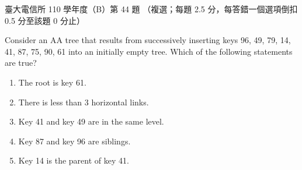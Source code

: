 \begin{pastexam}[label={px:ntu-110-comm-dsa-44}]{臺大電信所 110 學年度（B）第 44 題}
（複選；每題 2.5 分，每答錯一個選項倒扣 0.5 分至該題 0 分止）

Consider an AA tree that results from successively inserting keys 96, 49, 79, 14, 41, 87, 75, 90, 61 into an initially empty tree. Which of the following statements are true?
\begin{enumerate}[label=\Alph*.]
\item The root is key 61.
\item There is less than 3 horizontal links.
\item Key 41 and key 49 are in the same level.
\item Key 87 and key 96 are siblings.
\item Key 14 is the parent of key 41.
\end{enumerate}
\end{pastexam}

